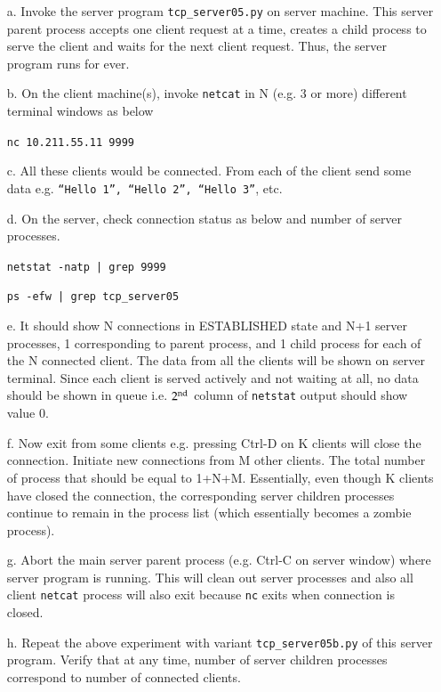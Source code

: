 \begin{multicols}{2}
\begin{itemize}
\item[a.] Invoke the server program \texttt{tcp\_server05.py} on server machine. This server parent process accepts one client request at a time, creates a child process to serve the client and waits for the next client request. Thus, the server program runs for ever.

\item[b.] On the client machine(s), invoke \texttt{netcat} in N (e.g. 3 or more) different terminal windows as below

\texttt{nc 10.211.55.11 9999}

\item[c.] All these clients would be connected. From each of the client send some data e.g. \texttt{“Hello 1”, “Hello 2”, “Hello 3”}, etc.

 \item[d.] On the server, check connection status as below and number of server processes.
 
 \texttt{netstat -natp | grep 9999}
 
 \texttt{ps -efw | grep tcp\_server05}
 
\item[e.] It should show N connections in ESTABLISHED state and N+1 server processes, 1 corresponding to parent process, and 1 child process for each of the N connected client. The data from all the clients will be shown on server terminal. Since each client is served actively and not waiting at all, no data should be shown in queue i.e. $2^{\rm nd}$ column of \texttt{netstat} output should show value 0.

\item[f.] Now exit from some clients e.g. pressing Ctrl-D on K clients will close the connection.  Initiate new connections from M other clients. The total number of process that should be equal to 1+N+M. Essentially, even though K clients have closed the connection, the corresponding server children processes continue to remain in the process list (which essentially becomes a zombie process).

\item[g.] Abort the main server parent process (e.g. Ctrl-C on server window) where server program is running. This will clean out server processes and also all client \texttt{netcat} process will also exit because \texttt{nc} exits when connection is closed.

\item[h.] Repeat the above experiment with variant \texttt{tcp\_server05b.py} of this server program. Verify that at any time, number of server children processes correspond to number of connected clients.


\end{itemize}
\end{multicols}
